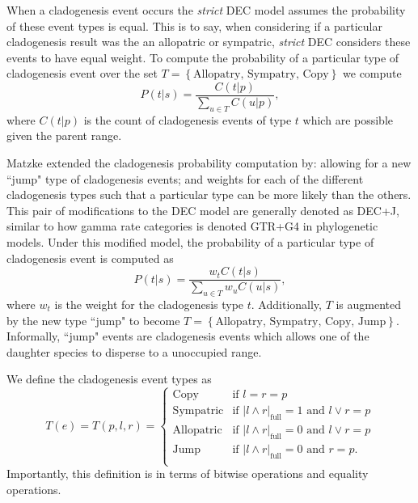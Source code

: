 \documentclass{article}
\newcommand{\CountFull}[1]{|#1|_\text{full}}
\newcommand{\rand}[2]{#1 \land #2}
\newcommand{\ror}[2]{#1 \lor #2}
\begin{document}
When a cladogenesis event occurs the \textit{strict} DEC model assumes the
probability of these event types is equal.
This is to say, when considering if a particular cladogenesis result was the
an allopatric or sympatric, \textit{strict} DEC considers these events to
have equal weight.
To compute the probability of a particular type of cladogenesis event over the
set \(T = \left\{\text{Allopatry, Sympatry, Copy}\right\}\) we compute
\[
	P(t |
	s) = \frac{C(t | p)}{\sum_{u \in T} C(u | p)},
\]
where \( C(t|p) \) is the
count of cladogenesis events of type $ t $ which are possible given the parent
range.

Matzke\cite{ModelSelectionMatzke2014} extended the cladogenesis probability
computation by: allowing for a new ``jump" type of cladogenesis events; and
weights for each of the different cladogenesis types such that a particular
type can be more likely than the others.
This pair of modifications to the DEC model are generally denoted as DEC+J,
similar to how gamma rate categories is denoted GTR+G4 in phylogenetic models.
Under this modified model, the probability of a particular type of cladogenesis
event is computed as
\begin{equation}
	P(t | s) = \frac{w_t C(t | s)}{\sum_{u \in T} w_u C(u |
		s)},
\end{equation}
where $w_t$ is the weight for the cladogenesis type $t$.
Additionally, $T$ is augmented by the new type ``jump" to become \(T =
\left\{\text{Allopatry, Sympatry, Copy, Jump}\right\} \).
Informally, ``jump" events are cladogenesis events which allows one of the
daughter species to disperse to a unoccupied range.

We define the cladogenesis event types as
\begin{equation}
T(e) = T(p, l, r) = 
\begin{cases}
  \text{Copy} & \text{if }l = r = p \\ 
  \text{Sympatric} & \text{if } \CountFull{\rand{l}{r}} = 1 \text{ and } \ror{l}{r} = p \\ 
  \text{Allopatric} & \text{if } \CountFull{\rand{l}{r}} = 0 \text{ and } \ror{l}{r} = p   \\ 
  \text{Jump} & \text{if } \CountFull{\rand{l}{r}} = 0 \text{ and } r = p. \\ 
\end{cases}
\label{eq:clad-test}
\end{equation}
Importantly, this definition is in terms of bitwise operations and equality
operations.
\end{document}
